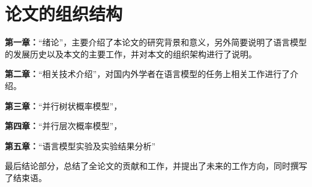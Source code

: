 \section{论文的组织结构}
\textbf{第一章：}``绪论''，主要介绍了本论文的研究背景和意义，另外简要说明了语言模型的发展历史以及本文的主要工作，并对本文的组织架构进行了说明。

\textbf{第二章：}``相关技术介绍''，对国内外学者在语言模型的任务上相关工作进行了介绍。

\textbf{第三章：}``并行树状概率模型''，


\textbf{第四章：}``并行层次概率模型''，

\textbf{第五章：}``语言模型实验及实验结果分析''

最后结论部分，总结了全论文的贡献和工作，并提出了未来的工作方向，同时撰写了结束语。



